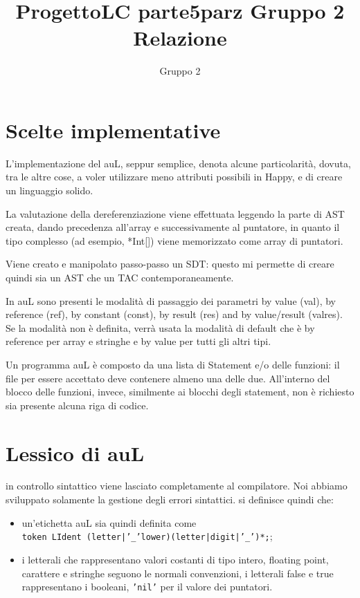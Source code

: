 \documentclass{article}
\title{ProgettoLC parte5parz Gruppo 2 Relazione}
\author{Gruppo 2 }
\begin{document}

\setcounter{page}{1}

\section{Scelte implementative}
L'implementazione del auL, seppur semplice, denota alcune particolarità, dovuta, tra le altre cose, a voler utilizzare
meno attributi possibili in Happy, e di creare un linguaggio solido.

La valutazione della dereferenziazione viene effettuata leggendo la parte di AST creata, dando precedenza all'array
e successivamente al puntatore, in quanto il tipo complesso (ad esempio, *Int[]) viene memorizzato come array di
puntatori.

Viene creato e manipolato passo-passo un SDT: questo mi permette di creare quindi sia un AST che un TAC contemporaneamente.

In auL sono presenti le modalità di passaggio dei parametri by value (val), by reference (ref), by constant (const), by 
result (res) and by value/result (valres). Se la modalità non è definita, verrà usata la modalità di default che è by 
reference per array e stringhe e by value per tutti gli altri tipi.

Un programma auL è composto da una lista di Statement e/o delle funzioni: il file per essere accettato deve contenere
almeno una delle due. All'interno del blocco delle funzioni, invece, similmente ai blocchi degli statement, non è richiesto
sia presente alcuna riga di codice.

\section{Lessico di auL}
in controllo sintattico viene lasciato completamente al compilatore. Noi abbiamo sviluppato solamente la gestione
degli errori sintattici. si definisce quindi che:
\begin{itemize}
	\item un'etichetta auL sia quindi definita come\\
		\texttt{token LIdent (letter|'\_'lower)(letter|digit|'\_')*;};
	
	\item i letterali che rappresentano valori costanti di tipo intero, floating point, carattere e stringhe 
	seguono le normali convenzioni, i letterali false e true rappresentano i booleani, \texttt{'nil'} per il valore
	dei puntatori.
\end{itemize}
\end{document}
